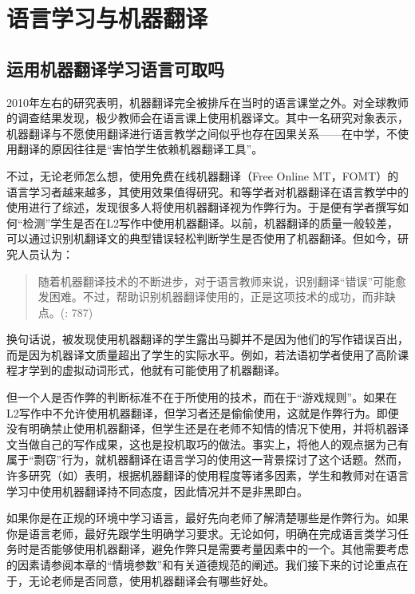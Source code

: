 \documentclass[output=paper,colorlinks,citecolor=brown]{langscibook}
\begin{document}
\section{语言学习与机器翻译}\label{sec:carre:3}
\subsection{运用机器翻译学习语言可取吗}
2010年左右的研究表明，机器翻译完全被排斥在当时的语言课堂之外。\citet{PymMalmkjaer2013}对全球教师的调查结果发现，极少教师会在语言课上使用机器译文。其中一名研究对象表示，机器翻译与不愿使用翻译进行语言教学之间似乎也存在因果关系——在中学，不使用翻译的原因往往是“害怕学生依赖机器翻译工具”\citep[93]{PymMalmkjaer2013}。

\begin{sloppypar}
不过，无论老师怎么想，使用免费在线机器翻译（Free Online MT，FOMT）的语言学习者越来越多，其使用效果值得研究。\citet{Lee2021}和\citet{JolleyMaimone2022}等学者对机器翻译在语言教学中的使用进行了综述，发现很多人将使用机器翻译视为作弊行为。于是便有学者撰写如何“检测”学生是否在L2写作中使用机器翻译。以前，机器翻译的质量一般较差，可以通过识别机翻译文的典型错误轻松判断学生是否使用了机器翻译。但如今，研究人员认为：\end{sloppypar}

\begin{quote}
随着机器翻译技术的不断进步，对于语言教师来说，识别翻译“错误”可能愈发困难。不过，帮助识别机器翻译使用的，正是这项技术的成功，而非缺点。(\citealt{DucarSchocket2018}: 787)
\end{quote}

换句话说，被发现使用机器翻译的学生露出马脚并不是因为他们的写作错误百出，而是因为机器译文质量超出了学生的实际水平。例如，若法语初学者使用了高阶课程才学到的虚拟动词形式，他就有可能使用了机器翻译。

但一个人是否作弊的判断标准不在于所使用的技术，而在于“游戏规则”。如果在L2写作中不允许使用机器翻译，但学习者还是偷偷使用，这就是作弊行为。即便没有明确禁止使用机器翻译，但学生还是在老师不知情的情况下使用，并将机器译文当做自己的写作成果，这也是投机取巧的做法。事实上，将他人的观点据为己有属于“剽窃”行为，\citet{MundtGroves2016}就机器翻译在语言学习的使用这一背景探讨了这个话题。然而，许多研究（如\citealt{Correa2011, Clifford2013, DucarSchocket2018}）表明，根据机器翻译的使用程度等诸多因素，学生和教师对在语言学习中使用机器翻译持不同态度，因此情况并不是非黑即白。

如果你是在正规的环境中学习语言，最好先向老师了解清楚哪些是作弊行为。如果你是语言老师，最好先跟学生明确学习要求。无论如何，明确在完成语言类学习任务时是否能够使用机器翻译，避免作弊只是需要考量因素中的一个。其他需要考虑的因素请参阅本章的“情境参数”和有关道德规范的阐述。我们接下来的讨论重点在于，无论老师是否同意，使用机器翻译会有哪些好处。
\end{document}
